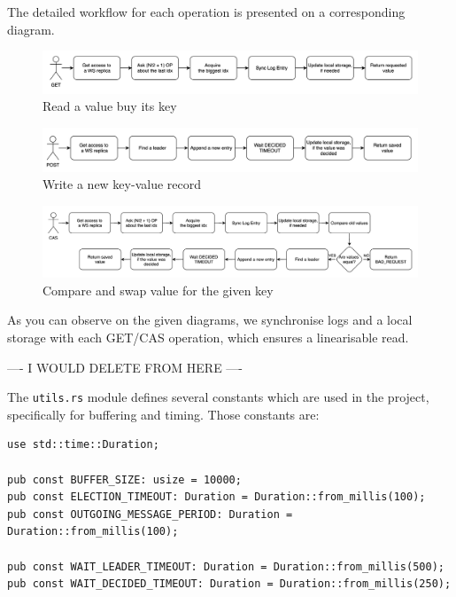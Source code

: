 \documentclass[a4paper, 11pt]{article}
\begin{document}
The detailed workflow for each operation is presented on a corresponding diagram.

\begin{figure}[H]
\centering
\includegraphics[width=\textwidth,keepaspectratio]{get.png}
\caption{Read a value buy its key}
\end{figure}

\begin{figure}[H]
\centering
\includegraphics[width=\textwidth,keepaspectratio]{post.png}
\caption{Write a new key-value record}
\end{figure}

\begin{figure}[H]
\centering
\includegraphics[width=\textwidth,keepaspectratio]{cas.png}
\caption{Compare and swap value for the given key}
\end{figure}

As you can observe on the given diagrams, we synchronise logs and a local storage with each GET/CAS operation, which ensures a linearisable read.

---- I WOULD DELETE FROM HERE ----

The \verb|utils.rs| module defines several constants which are used in the project, specifically for buffering and timing.
Those constants are:
\begin{verbatim}
use std::time::Duration;

pub const BUFFER_SIZE: usize = 10000;
pub const ELECTION_TIMEOUT: Duration = Duration::from_millis(100);
pub const OUTGOING_MESSAGE_PERIOD: Duration = Duration::from_millis(100);

pub const WAIT_LEADER_TIMEOUT: Duration = Duration::from_millis(500);
pub const WAIT_DECIDED_TIMEOUT: Duration = Duration::from_millis(250);
\end{verbatim}
\end{document}
